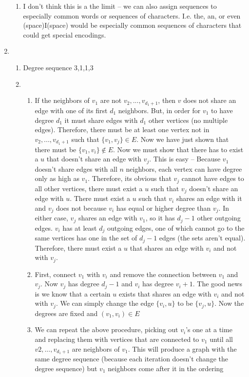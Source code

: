 \documentclass[11pt]{article}
\begin{document}
\begin{enumerate}
\begin{enumerate}
\item I don't think this is a the limit -- we can also assign sequences to especially common words or sequences of characters. I.e. the, an, or even (space)I(space) would be especially common sequences of characters that could get special encodings.
\end{enumerate}
\newpage
\item
\begin{enumerate}
\item Degree sequence 3,1,1,3
\item
\begin{enumerate}
\item If the neighbors of $v_1$ are not $v_2,..., v_{d_1+1}$, then $v$ does not share an edge with one of its first $d_1$ neighbors. But, in order for $v_1$ to have degree $d_1$ it must share edges with $d_1$ other vertices (no multiple edges). Therefore, there must be at least one vertex not in $v_2,..., v_{d_1+1}$ such that $\{v_1, v_j\}\in E$. Now we have just shown that there must be $\{v_1,v_i\} \notin E$. Now we must show that there has to exist a $u$ that doesn't share an edge with $v_j$. This is easy -- Because $v_1$ doesn't share edges with all $n$ neighbors, each vertex can have degree only as high as $v_1$. Therefore, its obvious that $v_j$ cannot have edges to all other vertices, there must exist a $u$ such that $v_j$ doesn't share an edge with $u$. There must exist a $u$ such that $v_i$ shares an edge with it and $v_j$ does not because $v_i$ has equal or higher degree than $v_j$. In either case, $v_j$ shares an edge with $v_1$, so it has $d_j-1$ other outgoing edges. $v_i$ has at least $d_j$ outgoing edges, one of which cannot go to the same vertices has one in the set of $d_j-1$ edges (the sets aren't equal). Therefore, there must exist a $u$ that shares an edge with $v_i$ and not with $v_j$.
\item First, connect $v_1$ with $v_i$ and remove the connection between $v_1$ and $v_j$. Now $v_j$ has degree $d_j-1$ and $v_i$ has degree $v_i+1$. The good news is we know that a certain $u$ exists that shares an edge with $v_i$ and not with $v_j$. We can simply change the edge $\{v_i,u\}$ to be $\{v_j,u\}$. Now the degrees are fixed and $(v_1,v_i)\in E$
\item We can repeat the above procedure, picking out $v_i$'s one at a time and replacing them with vertices that are connected to $v_1$ until all $v2,..., v_{d_1+1}$ are neighbors of $v_1$. This will produce a graph with the same degree sequence (because each iteration doesn't change the degree sequence) but $v_1$ neighbors come after it in the ordering

\end{enumerate}
\end{enumerate}
\end{enumerate}
\end{document}
